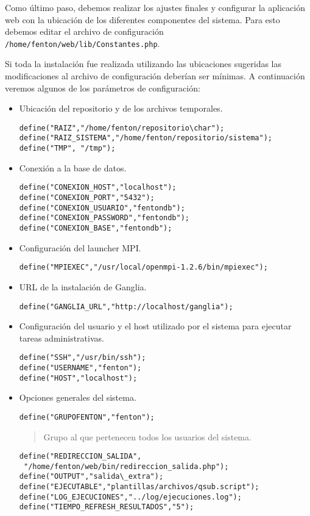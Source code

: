 \documentclass[a4paper,10pt,spanish]{article}
\begin{document}
Como \'{u}ltimo paso, debemos realizar los ajustes finales y configurar la aplicaci\'{o}n web con la ubicaci\'{o}n de los diferentes componentes del sistema. Para esto debemos editar el archivo de configuraci\'{o}n \mbox{\texttt{/home/fenton/web/lib/Constantes.php}}.

Si toda la instalaci\'{o}n fue realizada utilizando las ubicaciones sugeridas las modificaciones al archivo de configuraci\'{o}n deber\'{i}an ser m\'{i}nimas. A continuaci\'{o}n veremos algunos de los par\'{a}metros de configuraci\'{o}n:

\begin{itemize}
\item Ubicaci\'{o}n del repositorio y de los archivos temporales.
\begin{verbatim}
define("RAIZ","/home/fenton/repositorio\char");
define("RAIZ_SISTEMA","/home/fenton/repositorio/sistema");
define("TMP", "/tmp");
\end{verbatim}

\item Conexi\'{o}n a la base de datos.
\begin{verbatim}
define("CONEXION_HOST","localhost");
define("CONEXION_PORT","5432");
define("CONEXION_USUARIO","fentondb");
define("CONEXION_PASSWORD","fentondb");
define("CONEXION_BASE","fentondb");
\end{verbatim}

\item Configuraci\'{o}n del launcher MPI.
\begin{verbatim}
define("MPIEXEC","/usr/local/openmpi-1.2.6/bin/mpiexec");
\end{verbatim}

\item URL de la instalaci\'{o}n de Ganglia.
\begin{verbatim}
define("GANGLIA_URL","http://localhost/ganglia");
\end{verbatim}

\item Configuraci\'{o}n del usuario y el host utilizado por el sistema para ejecutar tareas administrativas.
\begin{verbatim}
define("SSH","/usr/bin/ssh"); 
define("USERNAME","fenton"); 
define("HOST","localhost");
\end{verbatim}

\item Opciones generales del sistema.
\begin{verbatim}
define("GRUPOFENTON","fenton");
\end{verbatim} 
\begin{quote}
Grupo al que pertenecen todos los usuarios del sistema.
\end{quote}
\begin{verbatim}
define("REDIRECCION_SALIDA",
 "/home/fenton/web/bin/redireccion_salida.php");
define("OUTPUT","salida\_extra");
define("EJECUTABLE","plantillas/archivos/qsub.script");
define("LOG_EJECUCIONES","../log/ejecuciones.log");
define("TIEMPO_REFRESH_RESULTADOS","5");


\end{verbatim}
\end{itemize}
\end{document}
